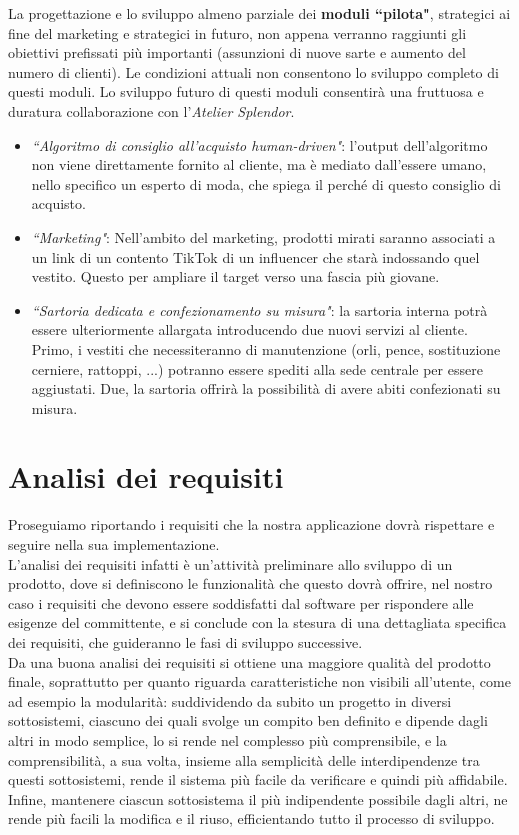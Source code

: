 \documentclass[12pt]{article}
\begin{document}
La progettazione e lo sviluppo almeno parziale dei \textbf{moduli ``pilota"}, strategici ai fine del marketing e strategici in futuro, non appena verranno raggiunti gli obiettivi prefissati più importanti (assunzioni di nuove sarte e aumento del numero di clienti). Le condizioni attuali non consentono lo sviluppo completo di questi moduli. Lo sviluppo futuro di questi moduli consentirà una fruttuosa e duratura collaborazione con l'{\em Atelier Splendor}.
\begin{itemize}
    \item {\em ``Algoritmo di consiglio all'acquisto human-driven"}: l'output dell'algoritmo non viene direttamente fornito al cliente, ma è mediato dall'essere umano, nello specifico un esperto di moda, che spiega il perché di questo consiglio di acquisto.
    \item {\em ``Marketing"}: Nell'ambito del marketing, prodotti mirati saranno associati a un link di un contento TikTok di un influencer che starà indossando quel vestito. Questo per ampliare il target verso una fascia più giovane.
    \item {\em ``Sartoria dedicata e confezionamento su misura"}: la sartoria interna potrà essere ulteriormente allargata introducendo due nuovi servizi al cliente. Primo, i vestiti che necessiteranno di manutenzione (orli, pence, sostituzione cerniere, rattoppi, ...) potranno essere spediti alla sede centrale per essere aggiustati. Due, la sartoria offrirà la possibilità di avere abiti confezionati su misura.
\end{itemize}


\section{Analisi dei requisiti}

Proseguiamo riportando i requisiti che la nostra applicazione dovrà rispettare e seguire nella sua implementazione.\\

L’analisi dei requisiti infatti è un’attività preliminare allo sviluppo di un prodotto, dove si definiscono le funzionalità che questo dovrà offrire, nel nostro caso i requisiti che devono essere soddisfatti dal software per rispondere alle esigenze del committente, e si conclude con la stesura di una dettagliata specifica dei requisiti, che guideranno le fasi di sviluppo successive.\\

Da una buona analisi dei requisiti si ottiene una maggiore qualità del prodotto finale, soprattutto per quanto riguarda caratteristiche non visibili all’utente, come ad esempio la modularità: suddividendo da subito un progetto in diversi sottosistemi, ciascuno dei quali svolge un compito ben definito e dipende dagli altri in modo semplice, lo si rende nel complesso più comprensibile, e la comprensibilità, a sua volta, insieme alla semplicità delle interdipendenze tra questi sottosistemi, rende il sistema più facile da verificare e quindi più affidabile.
Infine, mantenere ciascun sottosistema il più indipendente possibile dagli altri, ne rende più facili la modifica e il riuso, efficientando tutto il processo di sviluppo.
\end{document}

